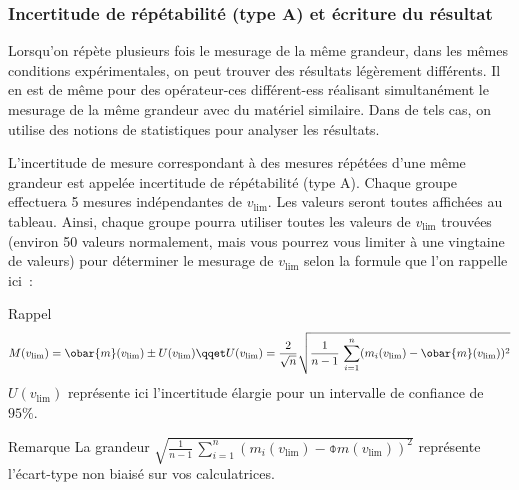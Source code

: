 \documentclass[a4paper, 11pt, final, garamond]{book}
\begin{document}
\subsubsection{Incertitude de répétabilité (type A) et écriture du résultat}

Lorsqu'on répète plusieurs fois le mesurage de la même grandeur, dans les mêmes
conditions expérimentales, on peut trouver des résultats légèrement différents.
Il en est de même pour des opérateur-ces différent-ess réalisant simultanément
le mesurage de la même grandeur avec du matériel similaire. Dans de tels cas, on
utilise des notions de statistiques pour analyser les résultats. \bigbreak

L'incertitude de mesure correspondant à des mesures répétées d'une même grandeur
est appelée incertitude de répétabilité (type A). Chaque groupe effectuera 5
mesures indépendantes de $v_{\lim}$. Les valeurs seront toutes affichées au
tableau. Ainsi, chaque groupe pourra utiliser toutes les valeurs de $v_{\lim}$
trouvées (environ 50 valeurs normalement, mais vous pourrez vous limiter à une
vingtaine de valeurs) pour déterminer le mesurage de $v_{\lim}$ selon la
formule que l'on rappelle ici~: 

\begin{timpo}{Rappel}
    \[
        M(v_{\lim}) = \obar{m}(v_{\lim}) \pm U(v_{\lim})
        \qqet
        U(v_{\lim}) = \frac{2}{\sqrt{n}} \sqrt{\frac{1}{n-1}
            \, \sum_{i=1}^{n} (m_i(v_{\lim})-\obar{m}(v_{\lim}))^2}
    \]
    $U(v_{\lim})$ représente ici l'incertitude élargie pour un intervalle de
    confiance de $95 \%$. 
\end{timpo}

\begin{rexem}{Remarque}
    La grandeur $\sqrt{\frac{1}{n-1} \, \sum_{i=1}^{n}
    (m_i(v_{\lim})-\obar{m}(v_{\lim}))^2}$ représente l'écart-type non biaisé
    sur vos calculatrices. 
\end{rexem}
\end{document}
